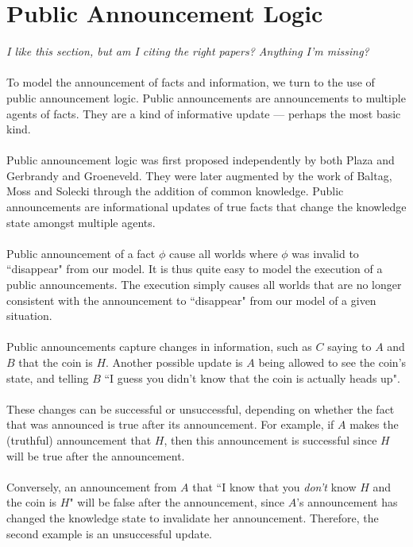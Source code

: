 \documentclass[12pt, a4paper, twoside]{article}
\begin{document}
\section{Public Announcement Logic}\label{pal}
{\em I like this section, but am I citing the right papers?
Anything I'm missing?}\\
\\
To model the announcement of facts and information, we turn to the use of public
announcement logic.
Public announcements are announcements to multiple agents of facts.
They are a kind of informative update --- perhaps the most basic kind.\\
\\
Public announcement logic was first proposed independently by both Plaza and
Gerbrandy and Groeneveld. \citep{plaza2007public,gelbrandy1997reasoning}
They were later augmented by the work of Baltag, Moss and Solecki through the
addition of common knowledge. \citep{baltag1998lpa}
Public announcements are informational updates of true facts that change the
knowledge state amongst multiple agents.\\
\\
Public announcement of a fact $\phi$ cause all worlds where $\phi$ was
invalid to ``disappear" from our model.
It is thus quite easy to model the execution of a public announcements.
The execution simply causes all worlds that are no longer consistent with the
announcement to ``disappear" from our model of a given situation.\\
\\
Public announcements capture changes in information, such as $C$ saying to
$A$ and $B$ that the coin is $H$.
Another possible update is $A$ being allowed to see the coin's state, and
telling $B$ ``I guess you didn't know that the coin is actually heads up".\\
\\
These changes can be successful or unsuccessful, depending on whether the fact
that was announced is true after its announcement.
For example, if $A$ makes the (truthful) announcement that $H$, then this
announcement is successful since $H$ will be true after the announcement.\\
\\
Conversely, an announcement from $A$ that ``I know that you {\em don't} know $H$
and the coin is $H$" will be false after the announcement, since $A$'s
announcement has changed the knowledge state to invalidate her
announcement.
Therefore, the second example is an unsuccessful update.\\
\end{document}
